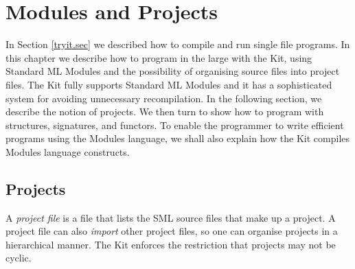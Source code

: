 \documentclass[12pt]{book}
\begin{document}
\chapter{Modules and Projects}
\label{modules_and_projects.chap}
In Section \ref{tryit.sec} we described how to compile and run single
file programs. In this chapter we describe how to program in the
large with the Kit, using Standard ML Modules and the possibility of
organising source files into project files. The Kit fully supports
Standard ML Modules and it has a sophisticated system for avoiding
unnecessary recompilation. In the following section, we describe the
notion of projects. We then turn to show how to program 
with structures, signatures, and functors. To enable the programmer
to write efficient programs using the Modules language, we
shall also explain how the Kit compiles Modules language constructs.


\section{Projects \label{projects.sec}}
A 
%
{\em project file\/} is a file that lists the SML source files
that make up a project. A project file can also 
%
{\em import\/} other project files, so one can organise projects in a
hierarchical manner.  The Kit enforces the restriction that projects
may not be cyclic.
\end{document}
